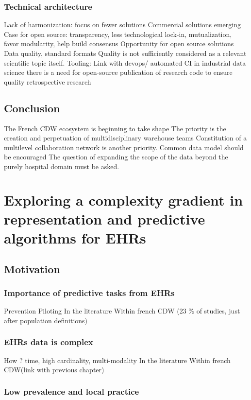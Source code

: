 \documentclass{report}
\begin{document}
\subsection{Technical architecture}
Lack of harmonization: focus on fewer solutions
Commercial solutions emerging
Case for open source: transparency, less technological lock-in, mutualization, favor modularity, help build consensus
Opportunity for open source solutions
Data quality, standard formats
Quality is not sufficiently considered as a relevant scientific topic itself.
Tooling: Link with devops/ automated CI in industrial data science
there is a need for open-source publication of research code to ensure quality retrospective research

\section{Conclusion}
The French CDW ecosystem is beginning to take shape
The priority is the creation and perpetuation of multidisciplinary warehouse teams
Constitution of a multilevel collaboration network is another priority.
Common data model should be encouraged
The question of expanding the scope of the data beyond the purely hospital domain must be asked.


\chapter{Exploring a complexity gradient in representation and predictive algorithms for EHRs}\label{chapter:predictive_models}
\section{Motivation}\label{sec:predictive_models:motivation}

\subsection{Importance of predictive tasks from EHRs}
Prevention
Piloting
In the literature
Within french CDW (23 \% of studies, just after population definitions)

\subsection{EHRs data is complex}
How ? time, high cardinality, multi-modality
In the literature
Within french CDW(link with previous chapter)

\subsection{Low prevalence and local practice}\label{subsec:predictive_models:low_prevalence}
\end{document}
